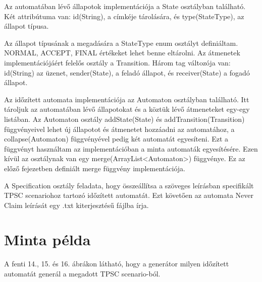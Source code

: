 Az automatában lévő állapotok implementációja a State osztályban található. Két attribútuma van: id(String), a címkéje tárolására, és type(StateType), az állapot típusa.

Az állapot típusának a megadására a StateType enum osztályt definiáltam. NORMAL, ACCEPT, FINAL értékeket lehet benne eltárolni. Az átmenetek implementációjáért felelős osztály a Transition. Három tag változója van: id(String) az üzenet, sender(State), a feladó állapot, és receiver(State) a fogadó állapot.

Az időzített automata implementációja az Automaton osztályban található. Itt tároljuk az automatában lévő állapotokat és a köztük lévő átmeneteket egy-egy listában. Az Automaton osztály addState(State) és addTransition(Transition) függvényeivel lehet új állapotot és átmenetet hozzáadni az automatához, a collapse(Automaton) függvényével pedig két automatát egyesíteni. Ezt a függvényt használtam az implementációban a minta automaták egyesítésére. Ezen kívül az osztálynak van egy merge(ArrayList<Automaton>) függvénye. Ez az előző fejezetben definiált merge függvény implementációja.

A Specification osztály feladata, hogy összeállítsa a szöveges leírásban specifikált TPSC scenariohoz tartozó időzített automatát. Ezt követően az automata Never Claim leírását egy .txt kiterjesztésű fájlba írja.

\section{Minta példa}

A fenti 14., 15. és 16. ábrákon látható, hogy a generátor milyen időzített automatát generál a megadott TPSC scenario-ból.